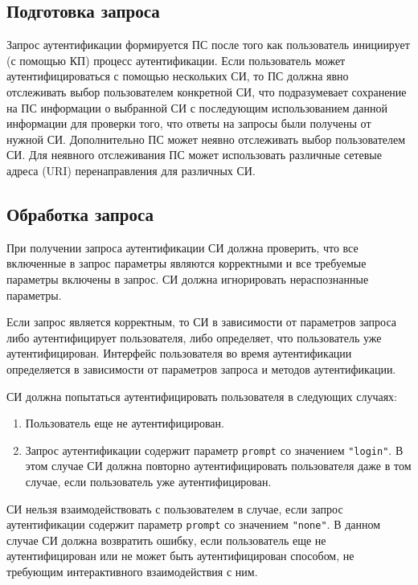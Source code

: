 \label{REQRESP.Auth}

\subsection{Подготовка запроса}\label{REQRESP.Auth.Pre}

Запрос аутентификации формируется ПС после того как пользователь
инициирует (с помощью КП) процесс аутентификации.
%
Если пользователь может аутентифицироваться с помощью нескольких СИ,
то ПС должна явно отслеживать выбор пользователем конкретной СИ, 
что подразумевает сохранение на ПС информации о выбранной СИ с последующим 
использованием данной информации для проверки того, что ответы на запросы были 
получены от нужной СИ. Дополнительно ПС может неявно отслеживать выбор 
пользователем СИ. Для неявного отслеживания ПС может использовать различные 
сетевые адреса (URI) перенаправления для различных СИ.

\subsection{Обработка запроса}\label{REQRESP.Auth.Req} 

При получении запроса аутентификации СИ должна проверить, что все включенные в
запрос параметры являются корректными и все требуемые параметры включены в
запрос.
%
СИ должна игнорировать нераспознанные параметры.

Если запрос является корректным, то СИ в зависимости от параметров запроса 
либо аутентифицирует пользователя, либо определяет, что пользователь уже 
аутентифицирован. 
%
Интерфейс пользователя во время аутентификации определяется в зависимости 
от параметров запроса и методов аутентификации.

СИ должна попытаться аутентифицировать пользователя в следующих случаях:
\begin{enumerate} 
\item Пользователь еще не аутентифицирован.

\item Запрос аутентификации содержит параметр \lstinline{prompt} со 
значением \lstinline{"login"}. В этом случае СИ должна повторно 
аутентифицировать пользователя даже в том случае, если пользователь уже 
аутентифицирован. 
\end{enumerate} 

СИ нельзя взаимодействовать с пользователем в случае,
если запрос аутентификации содержит параметр \lstinline{prompt} со 
значением \lstinline{"none"}. В данном случае СИ должна возвратить ошибку,
если пользователь еще не аутентифицирован или не может быть аутентифицирован  
способом, не требующим интерактивного взаимодействия с ним.

